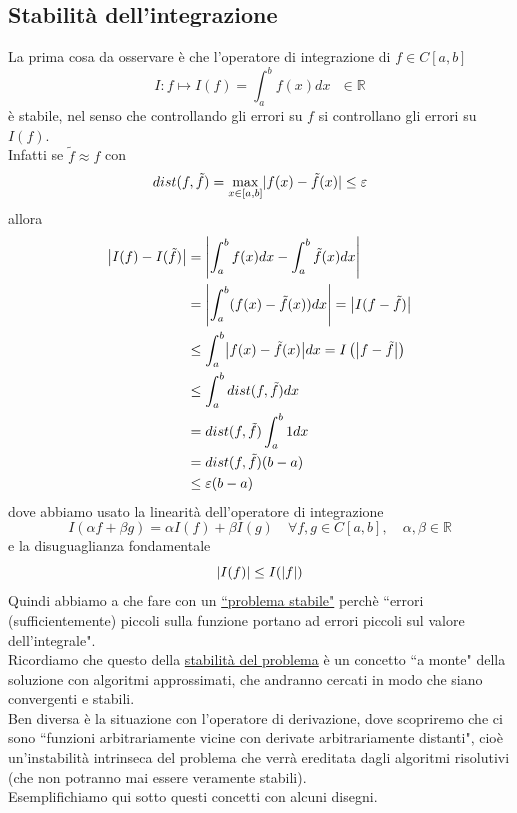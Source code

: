 \documentclass[12pt,a4paper]{article}
\DeclarePairedDelimiter{\abs}{\lvert}{\rvert}
\begin{document}
\subsection{Stabilità dell'integrazione}
La prima cosa da osservare è che l'operatore di integrazione di $f\in C[a,b]$
\begin{equation*}
    I:f\longmapsto I(f)=\int_a^bf(x) dx\  \  \  \in\mathbb{R}
\end{equation*}
è stabile, nel senso che controllando gli errori su $f$ si controllano gli errori su $I(f)$.\\ Infatti se $\tilde{f}\approx f$ con 
\begin{equation*}
dist(f,\tilde{f})= \max_{x\in[a,b]}\abs{f(x)-\tilde{f}(x)}\leq\varepsilon
\end{equation*}
allora
\begin{equation*}
\begin{split}
        \abs*{I(f)-I(\tilde{f})} & = \abs*{\int_a^b f(x)dx-\int_a^b \tilde{f}(x)dx} \\
        & = \abs*{\int_a^b(f(x)-\tilde{f}(x))dx} = \abs*{I(f-\tilde{f})} \\
        & \leq \int_a^b \abs*{f(x)-\tilde{f}(x)}dx = I\left(\abs*{f-\tilde{f}}\right) \\
        & \leq \int_a^b dist(f,\tilde{f})dx \\
        & = dist(f, \tilde{f})\int_a^b 1 dx \\
        & = dist(f, \tilde{f})(b-a)\\
        & \leq\varepsilon(b-a)
\end{split}
\end{equation*}
dove abbiamo usato la linearità dell'operatore di integrazione
\begin{equation*}
        I(\alpha f+\beta g)=\alpha I(f)+\beta I(g)\quad \forall f,g\in C[a,b],\quad \alpha,\beta\in\mathbb{R}
\end{equation*}
e la disuguaglianza fondamentale
\begin{equation*}
    \abs*{I(f)} \leq I(\abs*{f})
\end{equation*}
Quindi abbiamo a che fare con un \uline{``problema stabile"} perchè ``errori (sufficientemente) piccoli sulla funzione portano ad errori piccoli sul valore dell'integrale".\\
Ricordiamo che questo della \uline{stabilità del problema} è un concetto ``a monte" della soluzione con algoritmi approssimati, che andranno cercati in modo che siano convergenti e stabili. \\Ben diversa è la situazione con l'operatore di derivazione, dove scopriremo che ci sono ``funzioni arbitrariamente vicine con derivate arbitrariamente distanti", cioè un'instabilità intrinseca del problema che verrà ereditata dagli algoritmi risolutivi (che non potranno mai essere veramente stabili).\\ Esemplifichiamo  qui sotto questi concetti con alcuni disegni. 
\end{document}
